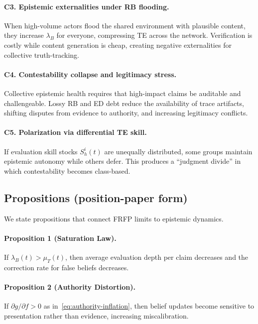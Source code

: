 \paragraph{C3. Epistemic externalities under RB flooding.}
When high-volume actors flood the shared environment with plausible content, they increase $\lambda_B$ for everyone, compressing TE across the network. Verification is costly while content generation is cheap, creating negative externalities for collective truth-tracking.

\paragraph{C4. Contestability collapse and legitimacy stress.}
Collective epistemic health requires that high-impact claims be auditable and challengeable. Lossy RB and ED debt reduce the availability of trace artifacts, shifting disputes from evidence to authority, and increasing legitimacy conflicts.

\paragraph{C5. Polarization via differential TE skill.}
If evaluation skill stocks $S_h^i(t)$ are unequally distributed, some groups maintain epistemic autonomy while others defer. This produces a ``judgment divide'' in which contestability becomes class-based.

\subsection{Propositions (position-paper form)}
We state propositions that connect FRFP limits to epistemic dynamics.

\paragraph{Proposition 1 (Saturation Law).}
If $\lambda_B(t)>\mu_T(t)$, then average evaluation depth per claim decreases and the correction rate for false beliefs decreases.

\paragraph{Proposition 2 (Authority Distortion).}
If $\partial g/\partial f>0$ as in~\eqref{eq:authority-inflation}, then belief updates become sensitive to presentation rather than evidence, increasing miscalibration.

